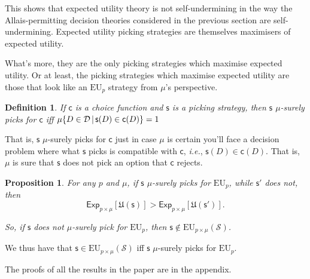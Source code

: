 \documentclass[a4paper]{article}
\newtheorem{definition}{Definition}
\newtheorem{proposition}[theorem]{Proposition}
\newcommand\D{\mathcal{D}}
\newcommand\s{\mathsf{s}}
\renewcommand\c{\mathsf{c}} %
\newcommand\Exp{\mathsf{Exp}}
\newcommand\EU{\mathrm{EU}}
\newcommand\U{\mathfrak{U}} %
\newcommand{\Strategies}{\mathcal{S}}
\newcommand\SetDelimiter[1][]{
	\nonscript\,#1\vert \allowbreak \nonscript\,\mathopen{}}
\providecommand\given{\SetDelimiter}
\newenvironment{CCM rewritten}
{\begingroup\color{blue}} %
{\endgroup}              %
\begin{document}
This shows that expected utility theory is not self-undermining in the way the Allais-permitting decision theories considered in the previous section are self-undermining. Expected utility picking strategies are themselves maximisers of expected utility. 

What's more, they are the only picking strategies which maximise expected utility. Or at least, the picking strategies which maximise expected utility are those that look like an $\EU_p$ strategy from $\mu$'s perspective. %

\begin{definition}
If $\c$ is a choice function and $\s$ is a picking strategy, then $\s$ \emph{$\mu$-surely picks for $\c$} iff $\mu\{D \in \D \given \s(D)\in \c(D)\}=1$
\end{definition}
{That is, $\s$ $\mu$-surely picks for $\c$ just in case $\mu$ is certain you'll face a decision problem where what $\s$ picks is compatible with $\c$, \textit{i.e.}, $\s(D)\in\c(D)$. That is, $\mu$ is sure that $\s$ does not pick an option that $\c$ rejects. }

\begin{proposition}\label{thm:eu-uniquely-optimal}
	For any $p$ and $\mu$, if $\s$ $\mu$-surely picks for $\EU_p$, while $\s'$ does not, then $$\Exp_{p\times\mu}[\U(\s)] > \Exp_{p\times\mu}[\U(\s')].$$
	
	So, if $\s$ does not $\mu$-surely pick for $\EU_p$, then $\s\notin\EU_{p\times\mu}(\Strategies)$. 
\end{proposition}

We thus have that $\s \in \EU_{p\times \mu}(\Strategies)$ iff $\s$ $\mu$-surely picks for $\EU_p$.

The proofs of all the results in the paper are in the appendix.
\end{document}
